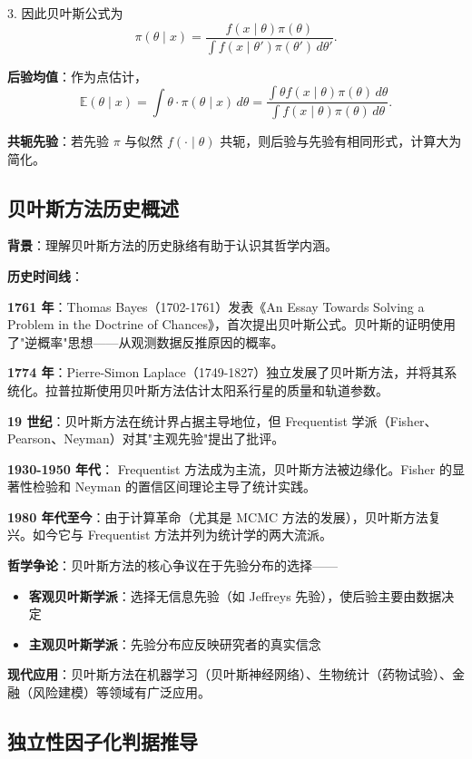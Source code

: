 3. 因此贝叶斯公式为
\[
\pi(\theta \mid x) = \frac{f(x \mid \theta) \pi(\theta)}{\int f(x \mid \theta') \pi(\theta') \, d\theta'}.
\]

\textbf{后验均值}：作为点估计，
\[
\mathbb{E}(\theta \mid x) = \int \theta \cdot \pi(\theta \mid x) \, d\theta = \frac{\int \theta f(x \mid \theta) \pi(\theta) \, d\theta}{\int f(x \mid \theta) \pi(\theta) \, d\theta}.
\]

\textbf{共轭先验}：若先验 $\pi$ 与似然 $f(\cdot \mid \theta)$ 共轭，则后验与先验有相同形式，计算大为简化。

\subsection{贝叶斯方法历史概述}\label{sec:derivation-ch2-bayes-history}

\textbf{背景}：理解贝叶斯方法的历史脉络有助于认识其哲学内涵。

\textbf{历史时间线}：

\textbf{1761 年}：Thomas Bayes（1702-1761）发表《An Essay Towards Solving a Problem in the Doctrine of Chances》，首次提出贝叶斯公式。贝叶斯的证明使用了"逆概率"思想——从观测数据反推原因的概率。

\textbf{1774 年}：Pierre-Simon Laplace（1749-1827）独立发展了贝叶斯方法，并将其系统化。拉普拉斯使用贝叶斯方法估计太阳系行星的质量和轨道参数。

\textbf{19 世纪}：贝叶斯方法在统计界占据主导地位，但 Frequentist 学派（Fisher、Pearson、Neyman）对其"主观先验"提出了批评。

\textbf{1930-1950 年代}： Frequentist 方法成为主流，贝叶斯方法被边缘化。Fisher 的显著性检验和 Neyman 的置信区间理论主导了统计实践。

\textbf{1980 年代至今}：由于计算革命（尤其是 MCMC 方法的发展），贝叶斯方法复兴。如今它与 Frequentist 方法并列为统计学的两大流派。

\textbf{哲学争论}：贝叶斯方法的核心争议在于先验分布的选择——
\begin{itemize}
\item \textbf{客观贝叶斯学派}：选择无信息先验（如 Jeffreys 先验），使后验主要由数据决定
\item \textbf{主观贝叶斯学派}：先验分布应反映研究者的真实信念
\end{itemize}

\textbf{现代应用}：贝叶斯方法在机器学习（贝叶斯神经网络）、生物统计（药物试验）、金融（风险建模）等领域有广泛应用。

\subsection{独立性因子化判据推导}\label{sec:derivation-ch2-independence}

